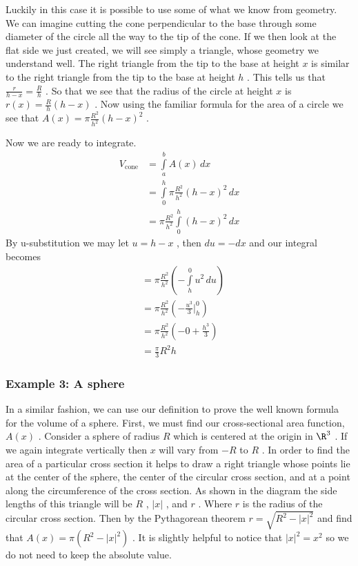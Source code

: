 Luckily in this case it is possible to use some of what we know from
geometry. We can imagine cutting the cone perpendicular to the base
through some diameter of the circle all the way to the tip of the cone.
If we then look at the flat side we just created, we will see simply a
triangle, whose geometry we understand well. The right triangle from the
tip to the base at height $x$ is similar to the right triangle from the
tip to the base at height $h$ . This tells us that
$\frac{r}{h-x}=\frac{R}{h}$ . So that we see that the radius of the
circle at height $x$ is $r(x)=\frac{R}{h}(h-x)$ . Now using the familiar
formula for the area of a circle we see that
$A(x)=\pi\frac{R^2}{h^2}(h-x)^2$ .

Now we are ready to integrate.
\begin{align} V _{\text{cone}} &= \int\limits_a^b A(x)\,dx \\ &= \int\limits_0^h \pi\frac{R^2}{h^2}(h-x)^2\,dx \\ &= \pi\frac{R^2}{h^2}\int\limits_0^h (h-x)^2\,dx \end{align} 
By u-substitution we may let $u=h-x$ , then $du=-dx$ and our integral becomes
\begin{align} &= \pi\frac{R^2}{h^2}\left(-\int\limits_h^0 u^2\,du\right) \\ &= \pi\frac{R^2}{h^2}\left(-\frac{u^3}{3}\bigg| _h^0\right) \\ &= \pi\frac{R^2}{h^2}\left(-0 + \frac{h^3}{3}\right) \\ &= \frac{\pi}{3} R^2 h \end{align} 


\subsubsection{Example 3: A sphere}
\label{sss:exam-8e36}
In a similar fashion, we can use our definition to prove the well known
formula for the volume of a sphere. First, we must find our
cross-sectional area function, $A(x)$ . Consider a sphere of radius $R$
which is centered at the origin in $\R^3$ . If we again integrate
vertically then $x$ will vary from $-R$ to $R$ . In order to find the
area of a particular cross section it helps to draw a right triangle
whose points lie at the center of the sphere, the center of the circular
cross section, and at a point along the circumference of the cross
section. As shown in the diagram the side lengths of this triangle will
be $R$ , $|x|$ , and $r$ . Where $r$ is the radius of the circular cross
section. Then by the Pythagorean theorem $r=\sqrt{R^2-|x|^2}$ and find
that $A(x)=\pi(R^2-|x|^2)$ . It is slightly helpful to notice that
$|x|^2=x^2$ so we do not need to keep the absolute value.

